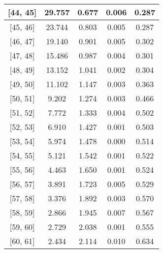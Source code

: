 \documentclass[12pt]{article}
\begin{document}
\begin{table}[]
\begin{tabular}{c|c|c|c|c|}
\multicolumn{1}{|c|}{{[}44,  45{]}}  & 29.757 & 0.677 & 0.006 & 0.287 \\ \hline 
\multicolumn{1}{|c|}{{[}45,  46{]}}  & 23.744 & 0.803 & 0.005 & 0.287 \\ \hline 
\multicolumn{1}{|c|}{{[}46,  47{]}}  & 19.140 & 0.901 & 0.005 & 0.302 \\ \hline 
\multicolumn{1}{|c|}{{[}47,  48{]}}  & 15.486 & 0.987 & 0.004 & 0.301 \\ \hline 
\multicolumn{1}{|c|}{{[}48,  49{]}}  & 13.152 & 1.041 & 0.002 & 0.304 \\ \hline 
\multicolumn{1}{|c|}{{[}49,  50{]}}  & 11.102 & 1.147 & 0.003 & 0.363 \\ \hline 
\multicolumn{1}{|c|}{{[}50,  51{]}}  & 9.202 & 1.274 & 0.003 & 0.466 \\ \hline 
\multicolumn{1}{|c|}{{[}51,  52{]}}  & 7.772 & 1.333 & 0.004 & 0.502 \\ \hline 
\multicolumn{1}{|c|}{{[}52,  53{]}}  & 6.910 & 1.427 & 0.001 & 0.503 \\ \hline 
\multicolumn{1}{|c|}{{[}53,  54{]}}  & 5.974 & 1.478 & 0.000 & 0.514 \\ \hline 
\multicolumn{1}{|c|}{{[}54,  55{]}}  & 5.121 & 1.542 & 0.001 & 0.522 \\ \hline 
\multicolumn{1}{|c|}{{[}55,  56{]}}  & 4.463 & 1.650 & 0.001 & 0.524 \\ \hline 
\multicolumn{1}{|c|}{{[}56,  57{]}}  & 3.891 & 1.723 & 0.005 & 0.529 \\ \hline 
\multicolumn{1}{|c|}{{[}57,  58{]}}  & 3.376 & 1.892 & 0.003 & 0.570 \\ \hline 
\multicolumn{1}{|c|}{{[}58,  59{]}}  & 2.866 & 1.945 & 0.007 & 0.567 \\ \hline 
\multicolumn{1}{|c|}{{[}59,  60{]}}  & 2.729 & 2.038 & 0.001 & 0.555 \\ \hline 
\multicolumn{1}{|c|}{{[}60,  61{]}}  & 2.434 & 2.114 & 0.010 & 0.634 \\ \hline 
\end{tabular}
\end{table}
\end{document}
